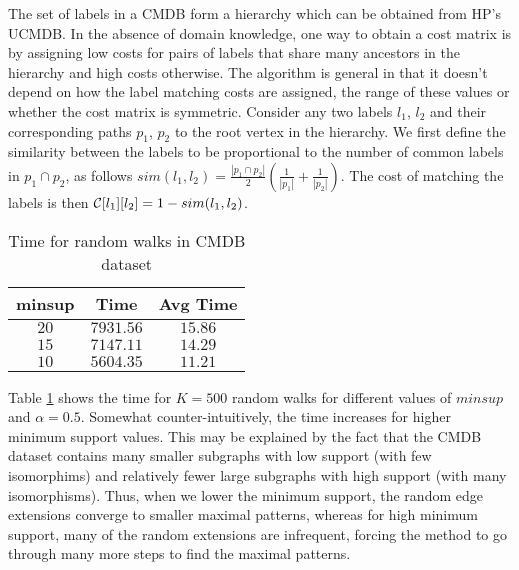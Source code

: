 \smallskip{} The set of labels in a CMDB
form a hierarchy which can be obtained from HP's UCMDB. In the absence
of domain knowledge, one way to obtain a cost matrix is by assigning low
costs for pairs of labels that share many ancestors in the hierarchy and
high costs otherwise. The algorithm is general in that it doesn't depend
on how the label matching costs are assigned, the range of these values
or whether the cost matrix is symmetric.  Consider any two labels $l_1$,
$l_2$ and their corresponding paths $p_1$, $p_2$ to the root vertex in
the hierarchy.  We first define the similarity between the labels to be
proportional to the number of common labels in $p_1 \cap p_2$, as
follows
$sim(l_1,l_2) =  \frac{|p_1 \cap p_2|}{2}
  \left(\frac{1}{|p_1|} + \frac{1}{|p_2|}\right)$.
The cost of matching the labels is then 
$\mathcal{C}[l_1][l_2] = 1 - sim(l_1,l_2)$.

\begin{table}[!h]
\centering
\begin{tabular}{|c|c|c|}
        \hline
        minsup & Time & Avg Time \\
		\hline
        $20$ & $7931.56$ & $15.86$\\
        $15$ & $7147.11$ & $14.29$\\
        $10$ & $5604.35$ & $11.21$\\
		\hline
    \end{tabular}
    \caption{Time for random walks in CMDB dataset}
\label{tab:ge}
\end{table}


\smallskip{} Table \ref{tab:ge} shows the time
for $K=500$ random walks for different values of $minsup$ and $\alpha =
0.5$. Somewhat counter-intuitively, the time
increases for higher minimum support values.  This may be explained by
the fact that the CMDB dataset contains many smaller subgraphs with
low support (with few isomorphims) and relatively fewer large subgraphs 
with high support (with many isomorphisms).
Thus, when we lower the minimum support, the random edge extensions
converge to smaller maximal patterns, whereas for high minimum support,
many of the random extensions are infrequent, forcing the method to go
through many more steps to find the maximal patterns. 

